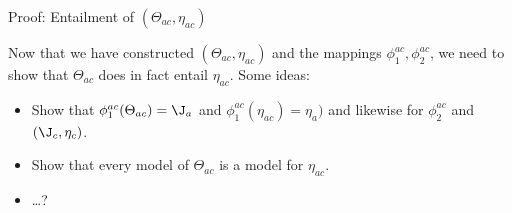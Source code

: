 \documentclass{beamer}
\begin{document}
\begin{frame}{Proof: Entailment of $(\Theta_{ac}, \eta_{ac})$}
\begin{figure}
\centering{
\scalebox{0.5}{%

}}
\end{figure}
Now that we have constructed $(\Theta_{ac}, \eta_{ac})$ and the mappings $\phi^{ac}_{1}, \phi^{ac}_{2}$, we need to show that $\Theta_{ac}$ does in fact entail $\eta_{ac}$. Some ideas:

\begin{itemize}
\item Show that $\phi^{ac}_{1}(\Theta_{ac}) = \J_{a}$ and $\phi^{ac}_{1}(\eta_{ac}) =  \eta_{a})$ and likewise for $\phi^{ac}_{2}$ and $(\J_{c}, \eta_{c})$.
\item Show that every model of $\Theta_{ac}$ is a model for $\eta_{ac}$.
\item \ldots?
\end{itemize}

\end{frame}
\end{document}
